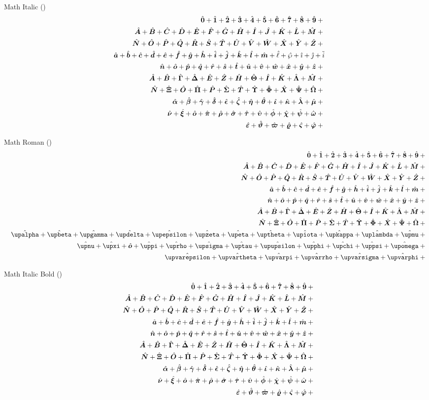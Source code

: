 \documentclass[11pt, a4paper, oneside]{article}
\theoremstyle{Plain}
\theoremstyle{Definition}
\theoremstyle{Remark}
\begin{document}
\begin{appendix}
	Math Italic (\texttt{\string\mathit})
	\def\test#1{\hat{\mathit{#1}}+{}}%
	\begin{eqnarray*}
	  && {\testnums}\\
	  && {\testupperi}\\
	  && {\testupperii}\\
	  && {\testloweri} \test\ell \test\wp \test\imath \test\jmath \tilde{i} \\
	  && {\testlowerii}\\
	  && {\testupgreeki}\\
	  && {\testupgreekii}\\
	  && {\testlowgreeki}\\
	  && {\testlowgreekii}\\
	  && {\testlowgreekiii}
	\end{eqnarray*}%

	Math Roman (\texttt{\string\mathrm})
	\def\test#1{\hat{\mathrm{#1}}+{}}%
	\begin{eqnarray*}
	  && {\testnums}\\
	  && {\testupperi}\\
	  && {\testupperii}\\
	  && {\testloweri}\\
	  && {\testlowerii}\\
	  && {\testupgreeki}\\
	  && {\testupgreekii}\\
	  && {\testlowgreekupi}\\
	  && {\testlowgreekupii}\\
	  && {\testlowgreekupiii}
	\end{eqnarray*}%

	Math Italic Bold (\texttt{\string\bm})
	\def\test#1{\hat{\bm{#1}}+{}}%
	\begin{eqnarray*}
	  && {\testnums}\\
	  && {\testupperi}\\
	  && {\testupperii}\\
	  && {\testloweri}\\
	  && {\testlowerii}\\
	  && {\testupgreeki}\\
	  && {\testupgreekii}\\
	  && {\testlowgreeki}\\
	  && {\testlowgreekii}\\
	  && {\testlowgreekiii}
	\end{eqnarray*}%


\end{appendix}
\end{document}
